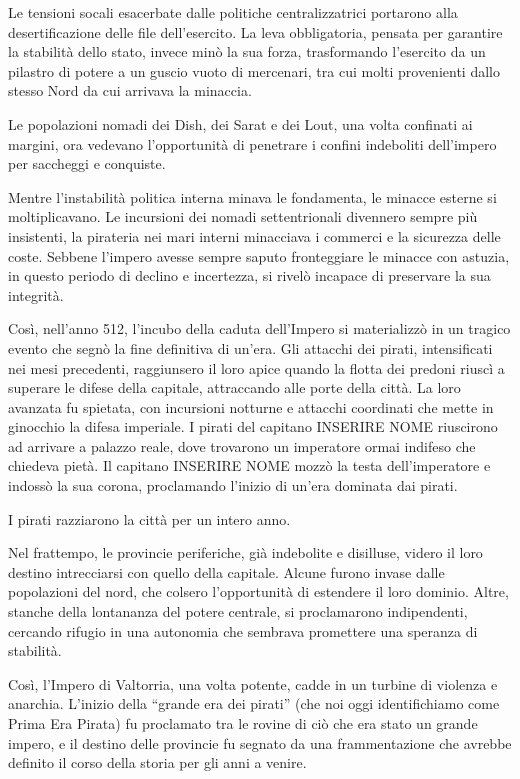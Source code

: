 Le tensioni socali esacerbate dalle politiche centralizzatrici portarono
alla desertificazione delle file dell'esercito. La leva obbligatoria,
pensata per garantire la stabilità dello stato, invece minò la sua
forza, trasformando l'esercito da un pilastro di potere a un guscio
vuoto di mercenari, tra cui molti provenienti dallo stesso Nord da cui
arrivava la minaccia.

Le popolazioni nomadi dei Dish, dei Sarat e dei Lout, una volta
confinati ai margini, ora vedevano l'opportunità di penetrare i confini
indeboliti dell'impero per saccheggi e conquiste.

Mentre l'instabilità politica interna minava le fondamenta, le minacce
esterne si moltiplicavano. Le incursioni dei nomadi settentrionali
divennero sempre più insistenti, la pirateria nei mari interni
minacciava i commerci e la sicurezza delle coste. Sebbene l'impero
avesse sempre saputo fronteggiare le minacce con astuzia, in questo
periodo di declino e incertezza, si rivelò incapace di preservare la sua
integrità.

Così, nell'anno 512, l'incubo della caduta dell'Impero si materializzò
in un tragico evento che segnò la fine definitiva di un'era. Gli
attacchi dei pirati, intensificati nei mesi precedenti, raggiunsero il
loro apice quando la flotta dei predoni riuscì a superare le difese
della capitale, attraccando alle porte della città. La loro avanzata fu
spietata, con incursioni notturne e attacchi coordinati che mette in
ginocchio la difesa imperiale. I pirati del capitano INSERIRE NOME
riuscirono ad arrivare a palazzo reale, dove trovarono un imperatore
ormai indifeso che chiedeva pietà. Il capitano INSERIRE NOME mozzò la
testa dell'imperatore e indossò la sua corona, proclamando l'inizio di
un'era dominata dai pirati.

I pirati razziarono la città per un intero anno.

Nel frattempo, le provincie periferiche, già indebolite e disilluse,
videro il loro destino intrecciarsi con quello della capitale. Alcune
furono invase dalle popolazioni del nord, che colsero l'opportunità di
estendere il loro dominio. Altre, stanche della lontananza del potere
centrale, si proclamarono indipendenti, cercando rifugio in una
autonomia che sembrava promettere una speranza di stabilità.

Così, l'Impero di Valtorria, una volta potente, cadde in un turbine di
violenza e anarchia. L'inizio della ``grande era dei pirati'' (che noi
oggi identifichiamo come Prima Era Pirata) fu proclamato tra le rovine
di ciò che era stato un grande impero, e il destino delle provincie fu
segnato da una frammentazione che avrebbe definito il corso della storia
per gli anni a venire.

